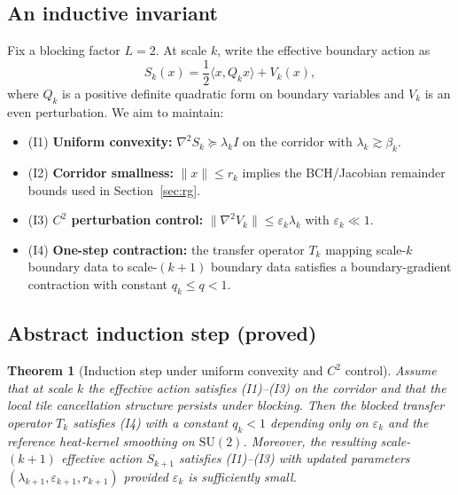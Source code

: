\documentclass[11pt]{article}
\newtheorem{theorem}{Theorem}[section]
\theoremstyle{definition}
\newcommand{\SU}{\mathrm{SU}}
\newcommand{\1}{\mathbf{1}}
\newcommand{\ip}[2]{\langle #1,#2\rangle}
\begin{document}
\subsection{An inductive invariant}
Fix a blocking factor $L=2$. At scale $k$, write the effective boundary action as
\[
S_k(x)=\frac12\ip{x}{Q_k x}+V_k(x),
\]
where $Q_k$ is a positive definite quadratic form on boundary variables and $V_k$ is an even perturbation.
We aim to maintain:
\begin{itemize}[leftmargin=2em]
\item (I1) \textbf{Uniform convexity:} $\nabla^2 S_k \succeq \lambda_k I$ on the corridor with $\lambda_k\gtrsim \beta_k$.
\item (I2) \textbf{Corridor smallness:} $\|x\|\le r_k$ implies the BCH/Jacobian remainder bounds used in Section~\ref{sec:rg}.
\item (I3) \textbf{$C^2$ perturbation control:} $\|\nabla^2 V_k\|\le \varepsilon_k \lambda_k$ with $\varepsilon_k\ll 1$.
\item (I4) \textbf{One-step contraction:} the transfer operator $T_k$ mapping scale-$k$ boundary data to scale-$(k+1)$ boundary data satisfies a boundary-gradient contraction with constant $q_k\le q<1$.
\end{itemize}

\subsection{Abstract induction step (proved)}
\begin{theorem}[Induction step under uniform convexity and $C^2$ control]
Assume that at scale $k$ the effective action satisfies (I1)--(I3) on the corridor and that the local tile cancellation structure persists under blocking. Then the blocked transfer operator $T_k$ satisfies (I4) with a constant $q_k<1$ depending only on $\varepsilon_k$ and the reference heat-kernel smoothing on $\SU(2)$. Moreover, the resulting scale-$(k+1)$ effective action $S_{k+1}$ satisfies (I1)--(I3) with updated parameters $(\lambda_{k+1},\varepsilon_{k+1},r_{k+1})$ provided $\varepsilon_k$ is sufficiently small.
\end{theorem}
\end{document}
